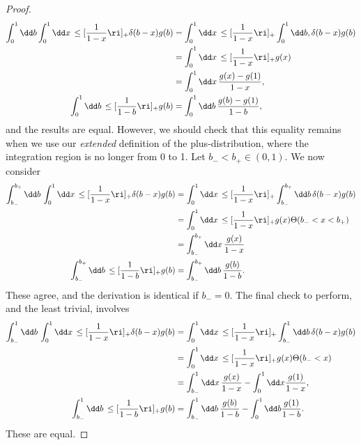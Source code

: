 \begin{example}{}
\begin{proof}
\begin{align}
    \int_0^1 \dd b \int_{0}^{1} \dd x\,\le[\frac{1}{1-x}\ri]_+ \delta(b - x) g(b)
    &=
    \int_{0}^{1} \dd x\,\le[\frac{1}{1-x}\ri]_+ \int_0^1 \dd b,\delta(b - x) g(b)
    \\
    \notag
    &=
    \int_{0}^{1} \dd x\,\le[\frac{1}{1-x}\ri]_+ g(x)
    \\
    \notag
    &=
    \int_{0}^{1} \dd x\,\frac{g(x) - g(1)}{1-x}
    ,
    \\
    \int_0^1 \dd b \,\le[\frac{1}{1-b}\ri]_+ g(b) &= \int_0^1 \dd b\, \frac{g(b) - g(1)}{1-b}
    ,
\end{align}
and the results are equal.
%
However, we should check that this equality remains when we use our \textit{extended} definition of the plus-distribution, where the integration region is no longer from 0 to 1.
%
Let \(b_- < b_+ \in (0,1)\).
%
We now consider
\begin{align}
    \int_{b_-}^{b_+}\dd b\,
    \int_0^1 \dd x\,
    \le[\frac{1}{1-x}\ri]_+
    \delta(b - x) g(b)
    &=
    \int_{0}^1 \dd x\,
    \le[\frac{1}{1-x}\ri]_+
    \int_{b_-}^{b_+}\dd b\,
    \delta(b - x) g(b)
    \\
    &=
    \notag
    \int_0^1 \dd x\,
    \le[\frac{1}{1-x}\ri]_+ g(x) \Theta(b_- < x < b_+)
    \\
    &=
    \notag
    \int_{b_-}^{b_+} \dd x\, \frac{g(x)}{1-x}
    \\
    \int_{b_-}^{b_+}\dd b\,
    \le[\frac{1}{1-b}\ri]_+ g(b)
    &=
    \int_{b_-}^{b_+} \dd b\, \frac{g(b)}{1-b}
    .
\end{align}
These agree, and the derivation is identical if \(b_- = 0\).
%
The final check to perform, and the least trivial, involves
\begin{align}
    \int_{b_-}^{1} \dd b \,
    \int_{0}^1 \dd x\,
    \le[\frac{1}{1-x}\ri]_+
    \delta(b - x) g(b)
    &=
    \int_{0}^1 \dd x\,
    \le[\frac{1}{1-x}\ri]_+
    \int_{b_-}^{1} \dd b\,
    \delta(b - x) g(b)
    \\
    &=
    \notag
    \int_0^1 \dd x\,
    \le[\frac{1}{1-x}\ri]_+
    g(x) \Theta(b_- < x )
    \\
    &=
    \notag
    \int_{b_-}^{1} \dd x\, \frac{g(x)}{1-x}
    -
    \int_0^1 \dd x \frac{g(1)}{1-x}
    ,
    \\
    \int_{b_-}^{1} \dd b\,
    \le[\frac{1}{1-b}\ri]_+ g(b)
    &=
    \int_{b_-}^{1} \dd b\, \frac{g(b)}{1-b}
    -
    \int_0^1 \dd b \frac{g(1)}{1-b}
    .
\end{align}
These are equal.
\end{proof}

\end{example}


